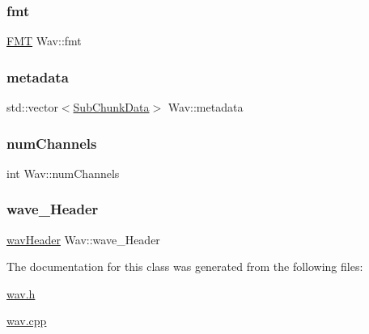 \mbox{\label{classWav_a2d8b662300b2821186951e428da6a6a9}} 
\subsubsection{\texorpdfstring{fmt}{fmt}}
{\footnotesize\ttfamily \hyperlink{structFMT}{F\+MT} Wav\+::fmt\hspace{0.3cm}{\ttfamily [protected]}}

\mbox{\label{classWav_ae6078b0bc65f5bcf4c2b7e3e7b4cf8bf}} 
\subsubsection{\texorpdfstring{metadata}{metadata}}
{\footnotesize\ttfamily std\+::vector$<$\hyperlink{structSubChunkData}{Sub\+Chunk\+Data}$>$ Wav\+::metadata\hspace{0.3cm}{\ttfamily [protected]}}

\mbox{\label{classWav_a82c5392364a4ccf8dfe725a3c7a403ec}} 
\subsubsection{\texorpdfstring{num\+Channels}{numChannels}}
{\footnotesize\ttfamily int Wav\+::num\+Channels\hspace{0.3cm}{\ttfamily [protected]}}

\mbox{\label{classWav_a3d95345a678bba0772e48325306ecda1}} 
\subsubsection{\texorpdfstring{wave\+\_\+\+Header}{wave\_Header}}
{\footnotesize\ttfamily \hyperlink{structwavHeader}{wav\+Header} Wav\+::wave\+\_\+\+Header\hspace{0.3cm}{\ttfamily [protected]}}



The documentation for this class was generated from the following files\+:\begin{DoxyCompactItemize}
\item 
\hyperlink{wav_8h}{wav.\+h}\item 
\hyperlink{wav_8cpp}{wav.\+cpp}\end{DoxyCompactItemize}
